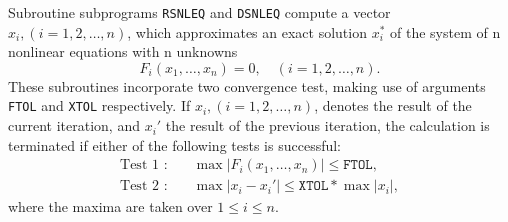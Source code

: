                           
     
                
                      
Subroutine subprograms {\tt RSNLEQ} and {\tt DSNLEQ} compute a vector
$x_i,(i=1,2,\ldots,n)$, which approximates an exact
solution $x_i^*$ of the
system of n nonlinear equations with n unknowns
$$ F_i(x_1,\ldots,x_n)=0,\quad (i=1,2,\ldots,n).$$
These subroutines incorporate two convergence test, making use of
arguments {\tt FTOL} and {\tt XTOL} respectively.
If $x_i,(i=1,2,\ldots,n)$, denotes
the result of the current iteration, and $x_i'$ the result of the
previous iteration, the calculation is terminated if either of the
following tests is successful:
$$\begin{array}{ll}
\mbox{Test 1 :} & \quad \max |F_i(x_1,\ldots,x_n)|\le \mathtt{FTOL,}\\
\mbox{Test 2 :} & \quad \max|x_i-x_i'| \le \mathtt{XTOL}*\max|x_i|,
\end{array}$$
where the maxima are taken over $ 1\le i\le n.$
 
